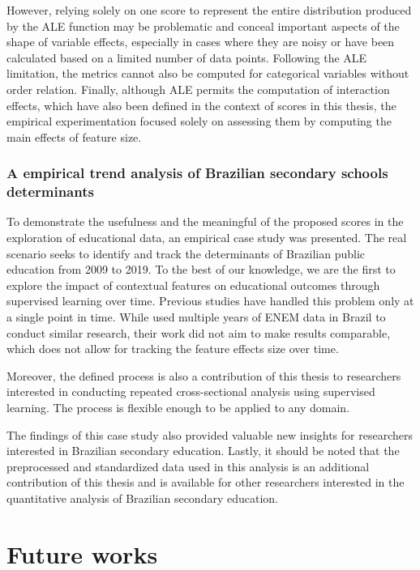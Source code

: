 However, relying solely on one score to represent the entire distribution produced by the \gls{ALE} function may be problematic and conceal important aspects of the shape of variable effects, especially in cases where they are noisy or have been calculated based on a limited number of data points. Following the \gls{ALE} limitation, the metrics cannot also be computed for categorical variables without order relation. Finally, although \gls{ALE} permits the computation of interaction effects, which have also been defined in the context of scores in this thesis, the empirical experimentation focused solely on assessing them by computing the main effects of feature size.

\subsubsection{A empirical trend analysis of Brazilian secondary schools determinants}

To demonstrate the usefulness and the meaningful of the proposed scores in the exploration of educational data, an empirical case study was presented. The real scenario seeks to identify and track the determinants of Brazilian public education from 2009 to 2019. To the best of our knowledge, we are the first to explore the impact of contextual features on educational outcomes through supervised learning over time. Previous studies have handled this problem only at a single point in time. While \cite{Franco2020UsandoAnos} used multiple years of ENEM data in Brazil to conduct similar research, their work did not aim to make results comparable, which does not allow for tracking the feature effects size over time.

Moreover, the defined process is also a contribution of this thesis to researchers interested in conducting repeated cross-sectional analysis using supervised learning. The process is flexible enough to be applied to any domain. 

The findings of this case study also provided valuable new insights for researchers interested in Brazilian secondary education. Lastly, it should be noted that the preprocessed and standardized data used in this analysis is an additional contribution of this thesis and is available \cite{SilvaFilho2022EnemCensus2009-2019} for other researchers interested in the quantitative analysis of Brazilian secondary education.
  

\section{Future works}

